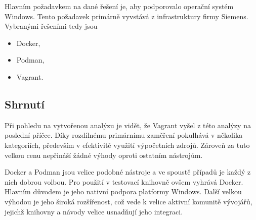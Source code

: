 Hlavním požadavkem na dané řešení je, aby podporovalo operační systém Windows. Tento požadavek primárně vyvstává z infrastruktury firmy Siemens. Vybranými řešeními tedy jsou

\begin{itemize}
    \item Docker,
    \item Podman,
    \item Vagrant. 
\end{itemize}


\subsection{Shrnutí}

Při pohledu na vytvořenou analýzu je vidět, že Vagrant vyšel z této analýzy na poslední příčce. Díky rozdílnému primárnímu zaměření pokulhává v několika kategoriích, především v efektivitě využití výpočetních zdrojů. Zároveň za tuto velkou cenu nepřináší žádné výhody oproti ostatním nástrojům.

Docker a Podman jsou velice podobné nástroje a ve spoustě případů je každý z nich dobrou volbou. Pro použití v testovací knihovně ovšem vyhrává Docker. Hlavním důvodem je jeho nativní podpora platformy Windows. Další velkou výhodou je jeho široká rozšířenost, což vede k velice aktivní komunitě vývojářů, jejichž knihovny a návody velice usnadňují jeho integraci. 
